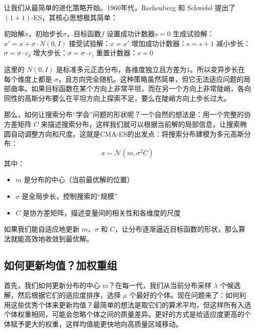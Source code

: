 \documentclass[lang=cn,zihao=-4,a4paper,fontset=windows]{beautybook}
\begin{document}
让我们从最简单的进化策略开始。1960年代，Rechenberg 和 Schwefel 提出了 $(1+1)$-ES，其核心思想极其简单：

\begin{algorithm}[H]
\caption{$(1+1)$-ES算法}
\begin{algorithmic}[1]
\REQUIRE 初始解$x$，初始步长$\sigma$，目标函数$f$
\STATE 设置成功计数器$s = 0$
    \STATE 生成试验解：$x' = x + \sigma \cdot N(0, I)$
        \STATE 接受试验解：$x = x'$
        \STATE 增加成功计数器：$s = s + 1$
    \ENDIF
            \STATE 减小步长：$\sigma = \sigma \cdot c_d$  
            \STATE 增大步长：$\sigma = \sigma \cdot c_i$  
        \ENDIF
        \STATE 重置计数器：$s = 0$
    \ENDIF
\ENDFOR
\end{algorithmic}
\end{algorithm}

这里的 $N(0,I)$ 是标准多元正态分布，各维度独立且方差为1。所以变异步长在每个维度上都是 $\sigma$，且方向完全随机。这种策略虽然简单，但它无法适应问题的局部曲率。如果目标函数在某个方向上非常平坦，而在另一个方向上非常陡峭，各向同性的高斯分布要么在平坦方向上探索不足，要么在陡峭方向上步长过大。

那么，如何让搜索分布“学会”问题的形状呢？一个自然的想法是：用一个完整的协方差矩阵 $C$ 来描述搜索分布，这样我们就可以根据当前解的局部信息，让搜索椭圆自动调整方向和尺度。这就是CMA-ES的出发点：将搜索分布建模为多元高斯分布：
\[
x \sim \mathcal{N}(m, \sigma^2 C)
\]
其中：
\begin{itemize}
    \item $m$ 是分布的中心（当前最优解的位置）
    \item $\sigma$ 是全局步长，控制搜索的“规模”
    \item $C$ 是协方差矩阵，描述变量间的相关性和各维度的尺度
\end{itemize}

如果我们能自适应地更新 $m$、$\sigma$ 和 $C$，让分布逐渐逼近目标函数的形状，那么算法就能高效地收敛到最优解。

\subsection{如何更新均值？加权重组}

首先，我们如何更新分布的中心 \(m\)？在每一代，我们从当前分布采样 \(\lambda\) 个候选解，然后根据它们的适应度排序，选择 \(\mu\) 个最好的个体。现在问题来了：如何利用这些优秀个体来更新均值？最简单的想法是取它们的算术平均，但这样所有入选个体权重相同，可能会忽略个体之间的质量差异。更好的方式是给适应度更高的个体赋予更大的权重，这样均值能更快地向高质量区域移动。
\end{document}

